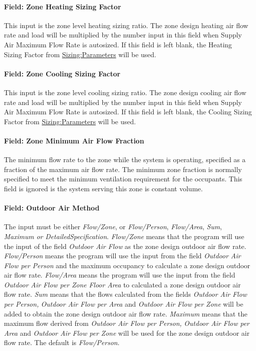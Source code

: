 \paragraph{Field: Zone Heating Sizing Factor}\label{field-zone-heating-sizing-factor-11}

This input is the zone level heating sizing ratio. The zone design heating air flow rate and load will be multiplied by the number input in this field when Supply Air Maximum Flow Rate is autosized. If this field is left blank, the Heating Sizing Factor from \hyperref[sizingparameters]{Sizing:Parameters} will be used.

\paragraph{Field: Zone Cooling Sizing Factor}\label{field-zone-cooling-sizing-factor-10}

This input is the zone level cooling sizing ratio. The zone design cooling air flow rate and load will be multiplied by the number input in this field when Supply Air Maximum Flow Rate is autosized. If this field is left blank, the Cooling Sizing Factor from \hyperref[sizingparameters]{Sizing:Parameters} will be used.

\paragraph{Field: Zone Minimum Air Flow Fraction}\label{field-zone-minimum-air-flow-fraction-000}

The minimum flow rate to the zone while the system is operating, specified as a fraction of the maximum air flow rate. The minimum zone fraction is normally specified to meet the minimum ventilation requirement for the occupants. This field is ignored is the system serving this zone is constant volume.

\paragraph{Field: Outdoor Air Method}\label{field-outdoor-air-method-12}

The input must be either \emph{Flow/Zone}, or \emph{Flow/Person}, \emph{Flow/Area}, \emph{Sum}, \emph{Maximum or DetailedSpecification}. \emph{Flow/Zone} means that the program will use the input of the field \emph{Outdoor Air Flow} as the zone design outdoor air flow rate. \emph{Flow/Person} means the program will use the input from the field \emph{Outdoor Air Flow per Person} and the maximum occupancy to calculate a zone design outdoor air flow rate. \emph{Flow/Area} means the program will use the input from the field \emph{Outdoor Air Flow per Zone Floor Area} to calculated a zone design outdoor air flow rate. \emph{Sum} means that the flows calculated from the fields \emph{Outdoor Air Flow per Person,} \emph{Outdoor Air Flow per Area} and \emph{Outdoor Air Flow per Zone} will be added to obtain the zone design outdoor air flow rate. \emph{Maximum} means that the maximum flow derived from \emph{Outdoor Air Flow per Person,} \emph{Outdoor Air Flow per Area} and \emph{Outdoor Air Flow per Zone} will be used for the zone design outdoor air flow rate. The default is \emph{Flow/Person}.

